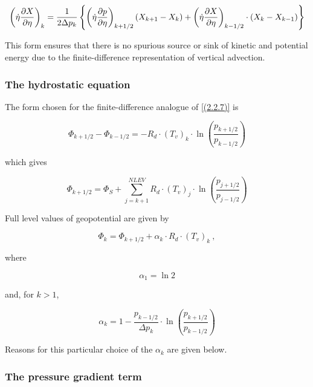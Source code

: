 \begin{equation}
\left(\dot{\eta}\frac {\partial X} {\partial \eta}\right)_k = \frac{1}{2\Delta p_k} 
\left\{\left(\dot{\eta}\frac {\partial p} {\partial \eta}\right)_{k+1/2}(X_{k+1}-X_k) 
+\left(\dot{\eta}\frac {\partial X} {\partial \eta}\right)_{k-1/2}\cdot (X_k-X_{k-1})\right\}
\label{(2.4.2.7)}
\end{equation}

This form ensures that there is no spurious source or sink of kinetic
and potential energy due to the finite-difference representation of
vertical advection.

\subsubsection{The hydrostatic equation}
 
The form chosen for the finite-difference
analogue of \ref{(2.2.7)} is


\begin{equation}
\Phi_{k+1/2}-\Phi_{k-1/2} = -R_d\cdot (T_v)_k
\cdot \ln{\left(\frac{p_{k+1/2}}{p_{k-1/2}}\right)}
\label{(2.4.2.8)}
\end{equation}

which gives

\begin{equation}
\Phi_{k+1/2} = \Phi_S + \sum\limits^{NLEV}_{j=k+1}R_d\cdot (T_v)_j
\cdot \ln {\left(\frac{p_{j+1/2}}{p_{j-1/2}}\right)}
\label{(2.4.2.9)}
\end{equation}

Full level values of geopotential are given by

\begin{equation}
\Phi_k = \Phi_{k+1/2} + \alpha_k\cdot R_d\cdot (T_v)_k\ ,
\label{(2.4.2.10)}
\end{equation}

where

\begin{equation}
 \alpha_1 = \ln 2
\label{(2.4.2.11)}
\end{equation}

 and, for $k > 1$,

\begin{equation}
\alpha_k = 1 - \frac{p_{k-1/2}}{\Delta p_k}
\cdot \ln {\left(\frac{p_{k+1/2}}{p_{k-1/2}}\right)}
\label{(2.4.2.12)}
\end{equation}

Reasons for this particular choice of the $\alpha_k$ are given
below. 

\subsubsection{The pressure gradient term}


